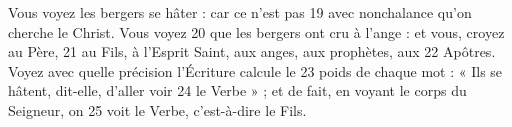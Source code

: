 Vous voyez les bergers se hâter : car ce n'est pas	 
19	 	avec nonchalance qu'on cherche le Christ. Vous voyez	 
20	 	que les bergers ont cru à l'ange : et vous, croyez au Père,	 
21	 	au Fils, à l'Esprit Saint, aux anges, aux prophètes, aux	 
22	 	Apôtres. Voyez avec quelle précision l'Écriture calcule le	 
23	 	poids de chaque mot : « Ils se hâtent, dit-elle, d'aller voir	 
24	 	le Verbe » ; et de fait, en voyant le corps du Seigneur, on	 
25	 	voit le Verbe, c'est-à-dire le Fils.